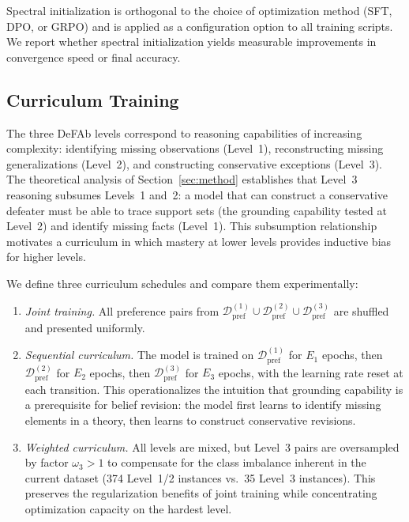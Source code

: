 \documentclass{article}
\theoremstyle{definition}
\begin{document}
Spectral initialization is orthogonal to the choice of optimization method (SFT, DPO, or GRPO) and is applied as a configuration option to all training scripts.  We report whether spectral initialization yields measurable improvements in convergence speed or final accuracy.


\subsection{Curriculum Training}\label{subsec:curriculum}

The three DeFAb levels correspond to reasoning capabilities of increasing complexity: identifying missing observations (Level~1), reconstructing missing generalizations (Level~2), and constructing conservative exceptions (Level~3). The theoretical analysis of Section~\ref{sec:method} establishes that Level~3 reasoning subsumes Levels~1 and~2: a model that can construct a conservative defeater must be able to trace support sets (the grounding capability tested at Level~2) and identify missing facts (Level~1). This subsumption relationship motivates a curriculum in which mastery at lower levels provides inductive bias for higher levels.

We define three curriculum schedules and compare them experimentally:

\begin{enumerate}[label=(\roman*),nosep]
    \item \textit{Joint training.} All preference pairs from $\mathcal{D}_{\mathrm{pref}}^{(1)} \cup \mathcal{D}_{\mathrm{pref}}^{(2)} \cup \mathcal{D}_{\mathrm{pref}}^{(3)}$ are shuffled and presented uniformly.

    \item \textit{Sequential curriculum.} The model is trained on $\mathcal{D}_{\mathrm{pref}}^{(1)}$ for $E_1$ epochs, then $\mathcal{D}_{\mathrm{pref}}^{(2)}$ for $E_2$ epochs, then $\mathcal{D}_{\mathrm{pref}}^{(3)}$ for $E_3$ epochs, with the learning rate reset at each transition. This operationalizes the intuition that grounding capability is a prerequisite for belief revision: the model first learns to identify missing elements in a theory, then learns to construct conservative revisions.

    \item \textit{Weighted curriculum.} All levels are mixed, but Level~3 pairs are oversampled by factor $\omega_3 > 1$ to compensate for the class imbalance inherent in the current dataset (374 Level~1/2 instances vs.\ 35 Level~3 instances). This preserves the regularization benefits of joint training while concentrating optimization capacity on the hardest level.
\end{enumerate}
\end{document}
